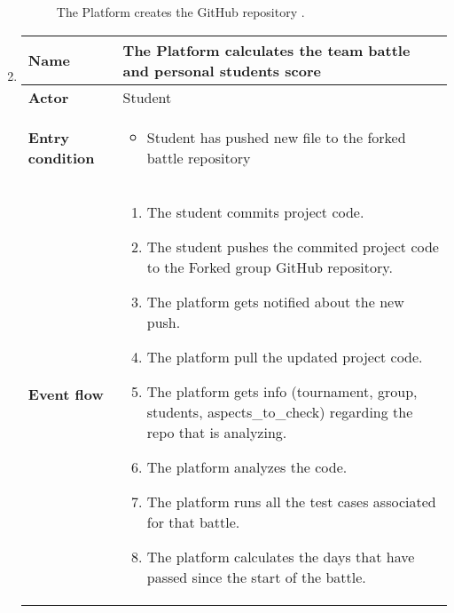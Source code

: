 \begin{enumerate}[label=\textbf{UC\arabic*}:,leftmargin=1.3cm]
            \begin{figure}[H]
                  \centering
                  \caption{The Platform creates the GitHub repository   .}
                  \label{fig:Battle registration deadline}
            \end{figure}
            \pagebreak
      \item \textbf{}
            \begin{table}[H]
                  \centering
                  \begin{tabular}{|l|p{11.9cm}|}
                        \hline
                        \textbf{Name}            & The Platform calculates the team battle and personal students score                    \\\hline
                        \textbf{Actor}           & Student                                                                                \\\hline
                        \textbf{Entry condition} &
                        \begin{itemize}
                              \item Student has pushed new file to the forked battle repository
                        \end{itemize}                                                  \\\hline
                        \textbf{Event flow}      &
                        \begin{enumerate}[label=\arabic*.]
                              \item The student commits project code.
                              \item The student pushes the commited project code to the Forked group GitHub repository.
                              \item The platform gets notified about the new push.
                              \item The platform pull the updated project code.
                              \item The platform gets info (tournament, group, students, aspects_to_check) regarding the repo that is analyzing.
                              \item The platform analyzes the code.
                              \item The platform runs all the test cases associated for that battle.
                              \item The platform calculates the days that have passed since the start of the battle.

\end{enumerate}
\end{tabular}
\end{table}
\end{enumerate}
